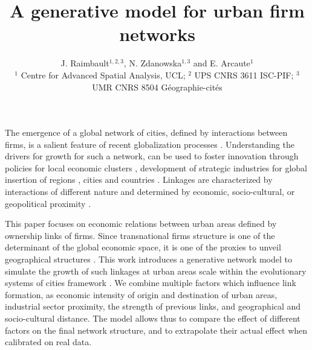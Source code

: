 \documentclass[10pt,letterpaper]{article}
\title{\vspace{-2.5cm}A generative model for urban firm networks}
\author{J. Raimbault$^{1,2,3}$, N. Zdanowska$^{1,3}$ and E. Arcaute$^1$\\\medskip\small
$^{1}$ Centre for Advanced Spatial Analysis, UCL; $^{2}$ UPS CNRS 3611 ISC-PIF; $^{3}$ UMR CNRS 8504 G{\'e}ographie-cit{\'e}s
}
\date{}
\begin{document}
\maketitle


\vspace{-0.5cm}

The emergence of a global network of cities, defined by interactions between firms, is a salient feature of recent globalization processes \cite{taylor2001specification}. Understanding the drivers for growth for such a network, can be used to foster innovation through policies for local economic clusters \cite{turkina2016structure}, development of strategic industries for global insertion of regions \cite{dawley2019creating}, cities \cite{gluckler2016relational} and countries \cite{martinus2019brokerage}. Linkages are characterized by interactions of different nature and determined by economic, socio-cultural, or geopolitical proximity \cite{martinus2018global}.


This paper focuses on economic relations between urban areas defined by ownership links of firms. Since transnational firms structure is one of the determinant of the global economic space, it is one of the proxies to unveil geographical structures \cite{2019arXiv191014652Z}. 
This work introduces a generative network model to simulate the growth of such linkages at urban areas scale within the evolutionary systems of cities framework \cite{pumain2018evolutionary}. We combine multiple factors which influence link formation, as economic intensity of origin and destination of urban areas, industrial sector proximity, the strength of previous links, and geographical and socio-cultural distance. The model allows thus to compare the effect of different factors on the final network structure, and to extrapolate their actual effect when calibrated on real data.
\end{document}
